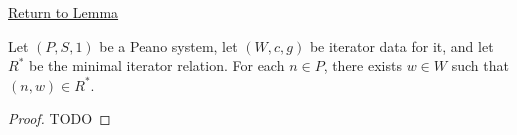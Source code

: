 \newpage
{}
\label{prf:minimal-iterator-relation-complete}

\begin{remark*}[Return]
\hyperref[lem:minimal-iterator-relation-complete]{Return to Lemma}
\end{remark*}

\begin{theorem*}
Let $(P,S,1)$ be a Peano system, let $(W,c,g)$ be iterator data for it, and let
$R^*$ be the minimal iterator relation. For each $n\in P$, there exists
$w\in W$ such that $(n,w)\in R^*$.
\end{theorem*}

\begin{proof}
TODO
\end{proof}
